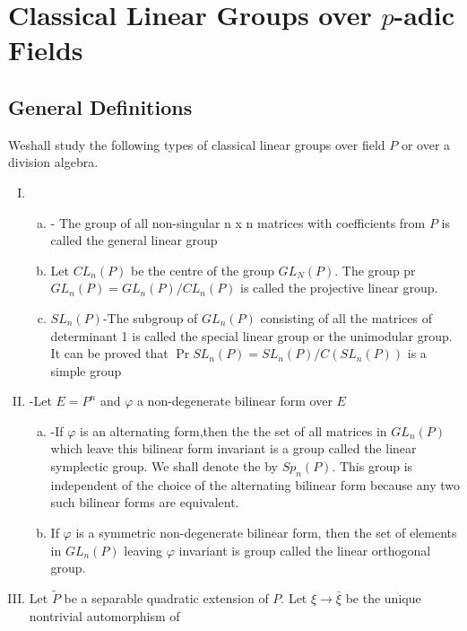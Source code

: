 \chapter{Classical Linear Groups over $p$-adic Fields}\label{part2:chap2}

\section{General Definitions}\label{part2:chap2:sec1}

We\pageoriginale shall study the following types of classical linear groups over
field $P$ or over a division algebra. 
\begin{enumerate}[(I)]
\item 
  \begin{enumerate}[(a)]
  \item {}- The group of all non-singular n x n
    matrices with coefficients from $P$ is called the general linear
    group 
  \item {} Let $C L_n (P)$ be the centre of the
    group $G L_N (P)$. The group pr $G L_n (P)= G L_n (P)/C L_n (P)$
    is called the projective linear group. 
  \item $S L_n (P)$-The subgroup of $G L_n (P)$ consisting of all the
    matrices of determinant 1 is called the special linear group or
    the unimodular group. It can be proved that $\Pr S L_n (P)=S L_n
    (P)/ C(S L_n(P))$ is a simple group 
  \end{enumerate}
\item -Let $E= P^n$ and $\varphi$ a non-degenerate bilinear form over $E$ 
  \begin{enumerate}[(a)]
  \item {}-If $\varphi$ is an alternating form,then
    the the set of all matrices in $G L_n(P)$ which leave this
    bilinear form invariant is a group called the linear symplectic
    group. We shall denote the by $Sp_n(P)$. This group is independent
    of the choice of the alternating bilinear form because any two
    such bilinear forms are equivalent. 
  \item If $\varphi$ is a symmetric non-degenerate bilinear form, then
    the set of elements in $G L_n(P)$ leaving $\varphi$ invariant is
    group called the linear orthogonal group. 
  \end{enumerate}
\item Let $\widetilde{P}$ be a separable quadratic extension of
  $P$. Let $\xi \to \bar{\xi}$ be the unique nontrivial automorphism of

\end{enumerate}
